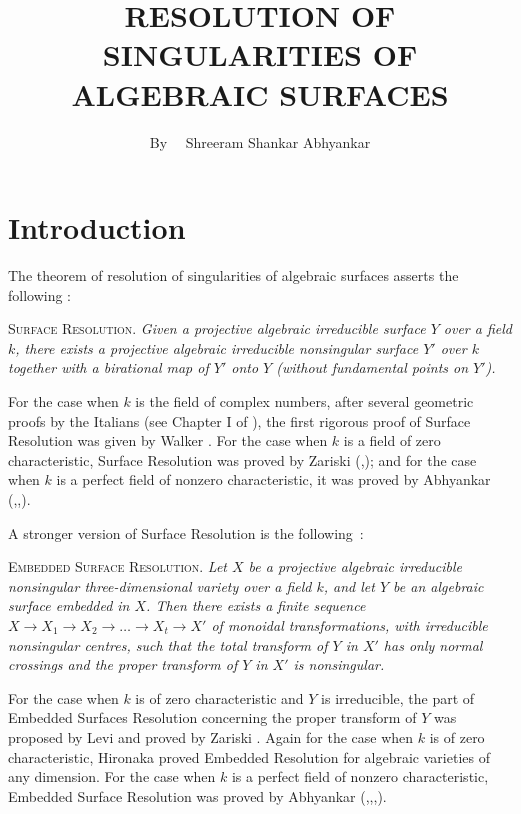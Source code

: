 \title{RESOLUTION OF SINGULARITIES OF ALGEBRAIC SURFACES}

\author{By~~ Shreeram Shankar Abhyankar}

\date{}

\maketitle

\setcounter{pageoriginal}{0}
\section{Introduction}\label{art01-sec1}
\pageoriginale 

The theorem of resolution of singularities of algebraic surfaces asserts the following :

\textsc{Surface Resolution.} {\em Given a projective algebraic irreducible surface $Y$ over a field $k$, there exists a projective algebraic irreducible nonsingular surface $Y'$ over $k$ together with a birational map of $Y'$ onto $Y$ (without fundamental points on $Y'$).}

For the case when $k$ is the field of complex numbers, after several geometric proofs by the Italians (see Chapter I of \cite{art01-key15}), the first rigorous proof of Surface Resolution was given by Walker \cite{art01-key14}. For the case when $k$ is a field of zero characteristic, Surface Resolution was proved by Zariski (\cite{art01-key16},\cite{art01-key17}); and for the case when $k$ is a perfect field of nonzero characteristic, it was proved by Abhyankar (\cite{art01-key2},\cite{art01-key3},\cite{art01-key4}).

A stronger version of Surface Resolution is the following~:

\medskip
\textsc{Embedded Surface Resolution.} {\em Let $X$ be a projective algebraic irreducible nonsingular three-dimensional variety over a field $k$, and let $Y$ be an algebraic surface embedded in $X$. Then there exists a finite sequence $X\to X_{1}\to X_{2}\to \ldots\to X_{t}\to X'$ of monoidal transformations, with irreducible nonsingular centres, such that the total transform of $Y$ in $X'$ has only normal crossings and the proper transform of $Y$ in $X'$ is nonsingular.}

For the case when $k$ is of zero characteristic and $Y$ is irreducible, the part of Embedded Surfaces Resolution concerning the proper transform of $Y$ was proposed by Levi \cite{art01-key13} and proved by Zariski \cite{art01-key18}. Again for the case when $k$ is of zero characteristic, Hironaka \cite{art01-key12} proved Embedded Resolution for algebraic varieties of any dimension. For the case when $k$ is a perfect field of nonzero characteristic, Embedded Surface Resolution was proved by Abhyankar (\cite{art01-key7},\cite{art01-key9},\cite{art01-key10},\cite{art01-key11}).


